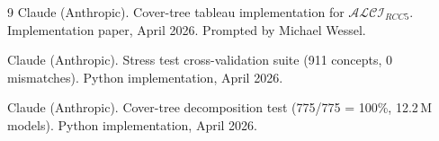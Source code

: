 \documentclass[11pt]{article}
\theoremstyle{definition}
\theoremstyle{remark}
\begin{document}
\begin{thebibliography}{9}
Claude (Anthropic).
\newblock Cover-tree tableau implementation for $\mathcal{ALCI}_{RCC5}$.
\newblock Implementation paper, April 2026.
\newblock Prompted by Michael Wessel.

Claude (Anthropic).
\newblock Stress test cross-validation suite (911 concepts, 0
  mismatches).
\newblock Python implementation, April 2026.

Claude (Anthropic).
\newblock Cover-tree decomposition test (775/775 = 100\%, 12.2\,M
  models).
\newblock Python implementation, April 2026.

\end{thebibliography}
\end{document}
